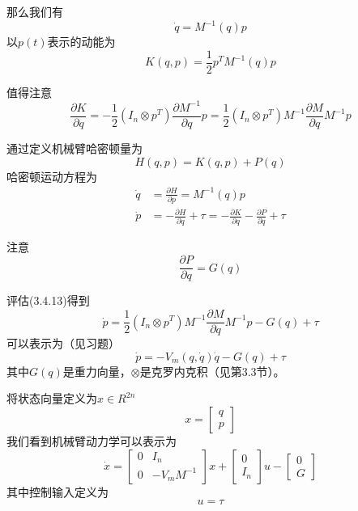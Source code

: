\documentclass[12pt,a4paper]{ctexart}
\begin{document}
那么我们有
\begin{equation}
\dot{q} = M^{-1}(q)p
\end{equation}
以$p(t)$表示的动能为
\begin{equation}
K(q,p) = \frac{1}{2}p^T M^{-1}(q)p
\end{equation}

值得注意
\begin{equation}
\frac{\partial K}{\partial q} = -\frac{1}{2}(I_n \otimes p^T)\frac{\partial M^{-1}}{\partial q}p = \frac{1}{2}(I_n \otimes p^T)M^{-1}\frac{\partial M}{\partial q}M^{-1}p
\end{equation}

通过定义机械臂哈密顿量为
\begin{equation}
H(q,p) = K(q,p) + P(q)
\end{equation}
哈密顿运动方程为
\begin{align}
\dot{q} &= \frac{\partial H}{\partial p} = M^{-1}(q)p \\
\dot{p} &= -\frac{\partial H}{\partial q} + \tau = -\frac{\partial K}{\partial q} - \frac{\partial P}{\partial q} + \tau
\end{align}

注意
\begin{equation}
\frac{\partial P}{\partial q} = G(q)
\end{equation}

评估(3.4.13)得到
\begin{equation}
\dot{p} = \frac{1}{2}(I_n \otimes p^T)M^{-1}\frac{\partial M}{\partial q}M^{-1}p - G(q) + \tau
\end{equation}
可以表示为（见习题）
\begin{equation}
\dot{p} = -V_m(q,\dot{q})\dot{q} - G(q) + \tau
\end{equation}
其中$G(q)$是重力向量，$\otimes$是克罗内克积（见第3.3节）。

将状态向量定义为$x \in R^{2n}$
\begin{equation}
x = \begin{bmatrix} q \\ p \end{bmatrix}
\end{equation}
我们看到机械臂动力学可以表示为
\begin{equation}
\dot{x} = \begin{bmatrix} 0 & I_n \\ 0 & -V_m M^{-1} \end{bmatrix}x + \begin{bmatrix} 0 \\ I_n \end{bmatrix}u - \begin{bmatrix} 0 \\ G \end{bmatrix}
\end{equation}
其中控制输入定义为
\begin{equation}
u = \tau
\end{equation}
\end{document}
